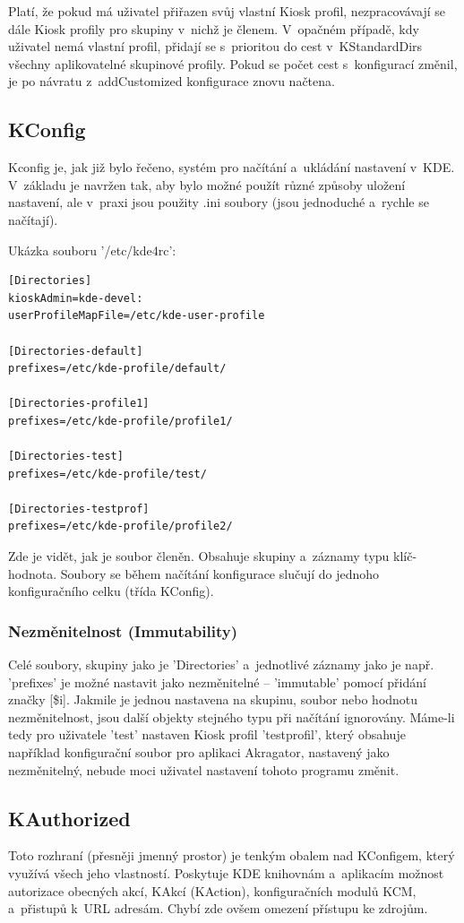 Platí, že pokud má uživatel přiřazen svůj vlastní Kiosk profil, nezpracovávají
se dále Kiosk profily pro skupiny v~nichž je členem. V~opačném případě, kdy
uživatel nemá vlastní profil, přidají se s~prioritou do cest v~KStandardDirs
všechny aplikovatelné skupinové profily. Pokud se počet cest s~konfigurací
změnil, je po návratu z~addCustomized konfigurace znovu načtena.

\subsection{KConfig}
Kconfig je, jak již bylo řečeno, systém pro načítání a~ukládání nastavení v~KDE.
V~základu je navržen tak, aby bylo možné použít různé způsoby uložení nastavení,
ale v~praxi jsou použity .ini soubory (jsou jednoduché a~rychle se načítají).



Ukázka souboru '/etc/kde4rc':
\begin{verbatim}
[Directories]
kioskAdmin=kde-devel:
userProfileMapFile=/etc/kde-user-profile

[Directories-default]
prefixes=/etc/kde-profile/default/

[Directories-profile1]
prefixes=/etc/kde-profile/profile1/

[Directories-test]
prefixes=/etc/kde-profile/test/

[Directories-testprof]
prefixes=/etc/kde-profile/profile2/
\end{verbatim}
Zde je vidět, jak je soubor členěn. Obsahuje skupiny a~záznamy typu
klíč-hodnota. Soubory se během načítání konfigurace slučují do jednoho
konfiguračního celku
(třída KConfig).

\subsubsection{Nezměnitelnost (Immutability)}
Celé soubory, skupiny jako je 'Directories' a~jednotlivé záznamy jako je např.
'prefixes' je možné nastavit jako nezměnitelné -- 'immutable' pomocí přidání
značky [\$i].
Jakmile je jednou nastavena na skupinu, soubor nebo hodnotu nezměnitelnost, jsou
další objekty stejného typu při načítání ignorovány. Máme-li tedy pro uživatele
'test' nastaven Kiosk profil 'testprofil', který obsahuje například konfigurační
soubor pro aplikaci Akragator, nastavený jako nezměnitelný, nebude moci uživatel
nastavení tohoto programu změnit.

\subsection{KAuthorized}
Toto rozhraní (přesněji jmenný prostor) je tenkým obalem nad KConfigem, který
využívá všech jeho vlastností. Poskytuje KDE knihovnám a~aplikacím možnost
autorizace obecných akcí, KAkcí (KAction), konfiguračních modulů KCM, a~přistupů
k~URL adresám.
Chybí zde ovšem omezení přístupu ke zdrojům.


